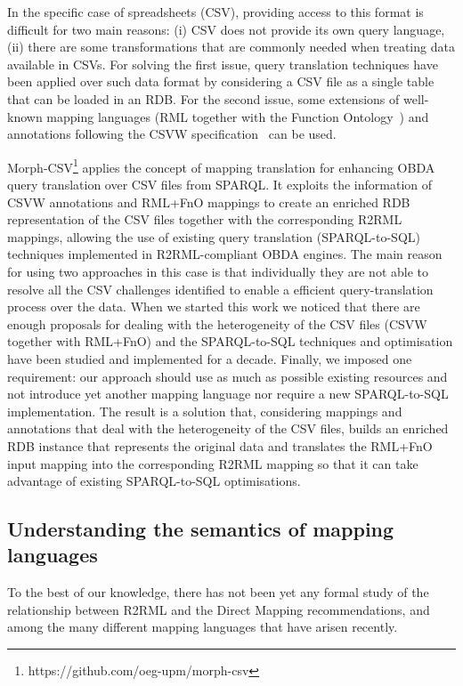 In the specific case of spreadsheets (CSV), providing access to this format is difficult for two main reasons: (i) CSV does not provide its own query language, (ii) there are some transformations that are commonly needed when treating data available in CSVs. For solving the first issue, query translation techniques have been applied over such data format by considering a CSV file as a single table that can be loaded in an RDB. For the second issue, some extensions of well-known mapping languages (RML together with the Function Ontology~\citep{de2017declarative}) and annotations following the CSVW specification~\citep{tennison2015model} can be used.

Morph-CSV\footnote{https://github.com/oeg-upm/morph-csv} applies the concept of mapping translation for enhancing OBDA query translation over CSV files from SPARQL. It exploits the information of CSVW annotations and RML+FnO mappings to create an enriched RDB representation of the CSV files together with the corresponding R2RML mappings, allowing the use of existing query translation (SPARQL-to-SQL) techniques implemented in R2RML-compliant OBDA engines. The main reason for using two approaches in this case is that individually they are not able to resolve all the CSV challenges identified to enable a efficient query-translation process over the data. When we started this work we noticed that there are enough proposals for dealing with the heterogeneity of the CSV files (CSVW together with RML+FnO) and the SPARQL-to-SQL techniques and optimisation have been studied and implemented for a decade. Finally, we imposed one requirement: our approach should use as much as possible existing resources and not introduce yet another mapping language nor require a new SPARQL-to-SQL implementation. The result is a solution that, considering mappings and annotations that deal with the heterogeneity of the CSV files, builds an enriched RDB instance that represents the original data and translates the RML+FnO input mapping into the corresponding R2RML mapping so that it can take advantage of existing SPARQL-to-SQL optimisations.


\subsection{Understanding the semantics of mapping languages}
To the best of our knowledge, there has not been yet any formal study of the relationship between R2RML and the Direct Mapping recommendations, and among the many different mapping languages that have arisen recently.


